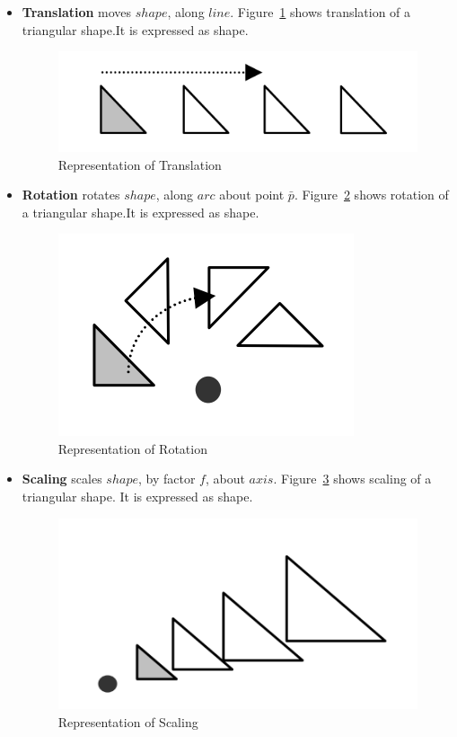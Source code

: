\begin{itemize}[noitemsep,topsep=2pt,parsep=2pt,partopsep=2pt]
\item {\bf Translation} moves $shape$, along $line$. Figure~\ref{fig:abstraction:hodatrans} shows translation of a triangular shape.It is expressed as 
 {shape}. 


\begin{figure}[!h]
\centering 
\includegraphics[width=0.35\linewidth]{images/hodatranslationterse} 
\caption{Representation of Translation}
\label{fig:abstraction:hodatrans}
\end{figure}



\item{\bf Rotation} rotates $shape$, along $arc$ about point $\bar{p}$.  Figure~\ref{fig:abstraction:hodarot} shows rotation of a triangular shape.It is expressed as 	
 {shape}.
	
%

\begin{figure}[!h]
\centering 
\includegraphics[width=0.35\linewidth]{images/hodarotation} 
\caption{Representation of Rotation}
\label{fig:abstraction:hodarot}
\end{figure}





\item {\bf Scaling} scales $shape$, by factor  $f$, about $axis$.  Figure~\ref{fig:abstraction:hodascale} shows scaling of a triangular shape. It is expressed as 
 {shape}.

\begin{figure}[!h]
\centering 
\includegraphics[width=0.35\linewidth]{images/hodascaling} 
\caption{Representation of Scaling}
\label{fig:abstraction:hodascale}
\end{figure}


\end{itemize}


